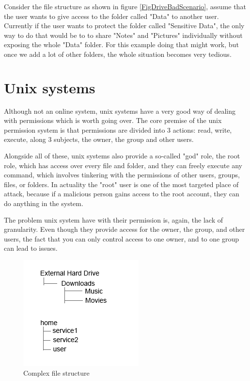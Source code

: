 Consider the file structure as shown in figure \ref{FigDriveBadScenario}, assume that the user wants to give access to the folder called "Data" to another user. Currently if the user wants to protect the folder called "Sensitive Data", the only way to do that would be to to share "Notes" and "Pictures" individually without exposing the whole "Data" folder. For this example doing that might work, but once we add a lot of other folders, the whole situation becomes very tedious.

\section{Unix systems}
Although not an online system, unix systems have a very good way of dealing with permissions which is worth going over. The core premise of the unix permission system is that permissions are divided into 3 actions: read, write, execute, along 3 subjects, the owner, the group and other users. 

Alongside all of these, unix systems also provide a so-called "god" role, the root role, which has access over every file and folder, and they can freely execute any command, which involves tinkering with the permissions of other users, groups, files, or folders. In actuality the "root" user is one of the most targeted place of attack, because if a malicious person gains access to the root account, they can do anything in the system.

The problem unix system have with their permission is, again, the lack of granularity. Even though they provide access for the owner, the group, and other users, the fact that you can only control access to one owner, and to one group can lead to issues.

\begin{figure}[htbp]
	\centering
		\includegraphics[scale=0.75]{./figures/chapter2/unix_file_structure.png}
	\caption{Complex file structure}
	\label{FigUnixBadScenario}
\end{figure}


